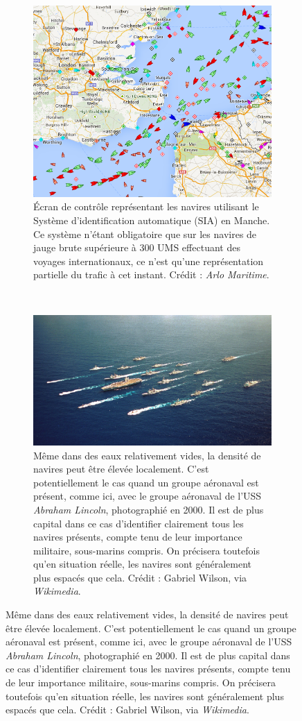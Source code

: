 	\begin{figure}[!htbp]
		\begin{subfigure}[t]{0.40\textwidth}
			\centering
			\includegraphics[width=\textwidth]{figures/ch1/channel}
			\caption[Écran de contrôle maritime en Manche (SIA)]{Écran de contrôle représentant les navires utilisant le Système d'identification automatique (SIA) en Manche. Ce système n'étant obligatoire que sur les navires de jauge brute supérieure à 300 UMS effectuant des voyages internationaux, ce n'est qu'une représentation partielle du trafic à cet instant. Crédit : \emph{Arlo Maritime}\footnotemark.}
			\label{fig:channel}
		\end{subfigure}
		~
		\begin{subfigure}[t]{0.58\textwidth}
			\centering
			\includegraphics[width=\textwidth]{figures/ch1/lincoln}
			\caption[Le groupe aéronaval de l'USS \emph{Abraham Lincoln}]{Même dans des eaux relativement vides, la densité de navires peut être élevée localement. C'est potentiellement le cas quand un groupe aéronaval est présent, comme ici, avec le groupe aéronaval de l'USS \emph{Abraham Lincoln}, photographié en 2000. Il est de plus capital dans ce cas d'identifier clairement tous les navires présents, compte tenu de leur importance militaire, sous-marins compris. On précisera toutefois qu'en situation réelle, les navires sont généralement plus espacés que cela. Crédit : Gabriel Wilson, via \emph{Wikimedia}.}

\end{subfigure}
\end{figure}
